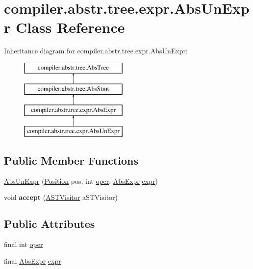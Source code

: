 \hypertarget{classcompiler_1_1abstr_1_1tree_1_1expr_1_1_abs_un_expr}{}\section{compiler.\+abstr.\+tree.\+expr.\+Abs\+Un\+Expr Class Reference}
\label{classcompiler_1_1abstr_1_1tree_1_1expr_1_1_abs_un_expr}
Inheritance diagram for compiler.\+abstr.\+tree.\+expr.\+Abs\+Un\+Expr\+:\begin{figure}[H]
\begin{center}
\leavevmode
\includegraphics[height=4.000000cm]{classcompiler_1_1abstr_1_1tree_1_1expr_1_1_abs_un_expr}
\end{center}
\end{figure}
\subsection*{Public Member Functions}
\begin{DoxyCompactItemize}
\item 
\hyperlink{classcompiler_1_1abstr_1_1tree_1_1expr_1_1_abs_un_expr_a017c608a0adebb41949d8ca472d8bd10}{Abs\+Un\+Expr} (\hyperlink{classcompiler_1_1_position}{Position} pos, int \hyperlink{classcompiler_1_1abstr_1_1tree_1_1expr_1_1_abs_un_expr_aa4e6ca3d47e0d1c7d64475227e426adf}{oper}, \hyperlink{classcompiler_1_1abstr_1_1tree_1_1expr_1_1_abs_expr}{Abs\+Expr} \hyperlink{classcompiler_1_1abstr_1_1tree_1_1expr_1_1_abs_un_expr_afb3beeff331ab75ac399f0815c552b50}{expr})
\item 
\mbox{\label{classcompiler_1_1abstr_1_1tree_1_1expr_1_1_abs_un_expr_a2797f7e9ac97eb89c5c4cfea11d60882}} 
void {\bfseries accept} (\hyperlink{interfacecompiler_1_1abstr_1_1_a_s_t_visitor}{A\+S\+T\+Visitor} a\+S\+T\+Visitor)
\end{DoxyCompactItemize}
\subsection*{Public Attributes}
\begin{DoxyCompactItemize}
\item 
final int \hyperlink{classcompiler_1_1abstr_1_1tree_1_1expr_1_1_abs_un_expr_aa4e6ca3d47e0d1c7d64475227e426adf}{oper}
\item 
final \hyperlink{classcompiler_1_1abstr_1_1tree_1_1expr_1_1_abs_expr}{Abs\+Expr} \hyperlink{classcompiler_1_1abstr_1_1tree_1_1expr_1_1_abs_un_expr_afb3beeff331ab75ac399f0815c552b50}{expr}
\end{DoxyCompactItemize}
